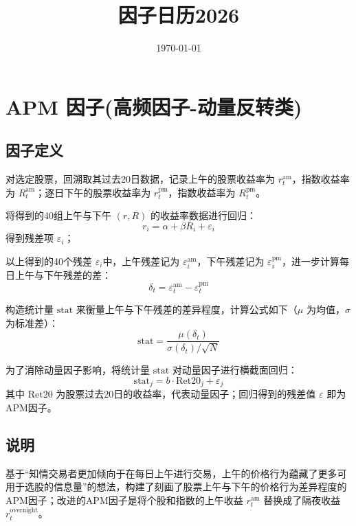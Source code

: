 \documentclass{article}
\title{因子日历2026}
\date{\today}
\begin{document}
\maketitle

\section{APM 因子(高频因子-动量反转类)}

\subsection{因子定义}

对选定股票，回溯取其过去20日数据，记录上午的股票收益率为 \( r_t^{\mathrm{am}} \)，指数收益率为 \( R_t^{\mathrm{am}} \)；逐日下午的股票收益率为 \( r_t^{\mathrm{pm}} \)，指数收益率为 \( R_t^{\mathrm{pm}} \)。

将得到的40组上午与下午 \((r, R)\) 的收益率数据进行回归：
\begin{equation}
    r_i = \alpha + \beta R_i + \varepsilon_i
\end{equation}
得到残差项 \( \varepsilon_i \)；

以上得到的40个残差 \( \varepsilon_i \)中，上午残差记为 \( \varepsilon_i^{\mathrm{am}} \)，下午残差记为 \( \varepsilon_i^{\mathrm{pm}} \)，进一步计算每日上午与下午残差的差：
\begin{equation}
    \delta_t = \varepsilon_t^{\mathrm{am}} - \varepsilon_t^{\mathrm{pm}}
\end{equation}

构造统计量 \( \mathrm{stat} \) 来衡量上午与下午残差的差异程度，计算公式如下（\( \mu \) 为均值，\( \sigma \) 为标准差）：
\begin{equation}
    \mathrm{stat} = \frac{\mu(\delta_t)}{\sigma(\delta_t) / \sqrt{N}}
\end{equation}

为了消除动量因子影响，将统计量 \( \mathrm{stat} \) 对动量因子进行横截面回归：
\begin{equation}
    \mathrm{stat}_j = b \cdot \mathrm{Ret20}_j + \varepsilon_j
\end{equation}
其中 \( \mathrm{Ret20} \) 为股票过去20日的收益率，代表动量因子；回归得到的残差值 \( \varepsilon \) 即为APM因子。

\subsection{说明}
基于“知情交易者更加倾向于在每日上午进行交易，上午的价格行为蕴藏了更多可用于选股的信息量”的想法，构建了刻画了股票上午与下午的价格行为差异程度的APM因子；改进的APM因子是将个股和指数的上午收益 \( r_t^{\mathrm{am}} \) 替换成了隔夜收益 \( r_t^{\mathrm{overnight}} \)。
\end{document}
